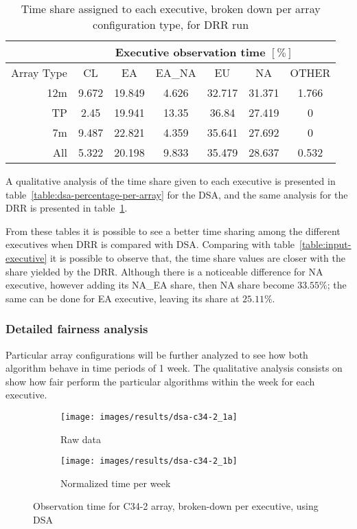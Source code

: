 \begin{table}[t]
\centering
\begin{tabular}{c|c|c|c|c|c|c|} 
\cline{2-7}
 & \multicolumn{6}{c|}{Executive observation time $[\%]$} \\ \hline
\multicolumn{1}{|r|}{Array Type} & CL	& EA & EA\_NA &	EU & NA & OTHER \\ \hline
\multicolumn{1}{|r|}{12m} & 9.672 & 19.849 & 4.626 & 32.717 & 31.371 & 1.766 \\ \hline
\multicolumn{1}{|r|}{TP} & 2.45 & 19.941 & 13.35 & 36.84 & 27.419 & 0 \\ \hline
\multicolumn{1}{|r|}{7m} & 9.487 & 22.821 & 4.359 & 35.641 & 27.692 & 0 \\ \hline
\multicolumn{1}{|r|}{All} & 5.322 & 20.198 & 9.833 & 35.479 & 28.637 & 0.532 \\ \hline
\end{tabular}
\caption{Time share assigned to each executive, broken down per array configuration type, for DRR run}
\label{table:drr-percentage-per-array}
\end{table}

A qualitative analysis of the time share given to each executive is presented in table~\ref{table:dsa-percentage-per-array} for the DSA, and the same analysis for the DRR is presented in table~\ref{table:drr-percentage-per-array}. 

From these tables it is possible to see a better time sharing among the different executives when DRR is compared with DSA. Comparing with table~\ref{table:input-executive} it is possible to observe that, the time share values are closer with the share yielded by the DRR. Although there is a noticeable difference for NA executive, however adding its NA\_EA share, then NA share become $33.55\%$; the same can be done for EA executive, leaving its share at $25.11\%$.

\subsubsection{Detailed fairness analysis}
Particular array configurations will be further analyzed to see how both algorithm behave in time periods of 1 week. The qualitative analysis consists on show how fair perform the particular algorithms within the week for each executive.

\begin{figure}[t]
\centering
	\begin{subfigure}[b]{0.49\textwidth}
		\texttt{[image: images/results/dsa-c34-2\_1a]}
        \caption{Raw data} 
    \end{subfigure} 
    \begin{subfigure}[b]{0.49\textwidth}
    		\texttt{[image: images/results/dsa-c34-2\_1b]}
            \caption{Normalized time per week} 
    \end{subfigure}
    \caption{Observation time for C34-2 array, broken-down per executive, using DSA}
    \label{fig:dsa-c34-2-exec}
\end{figure}

